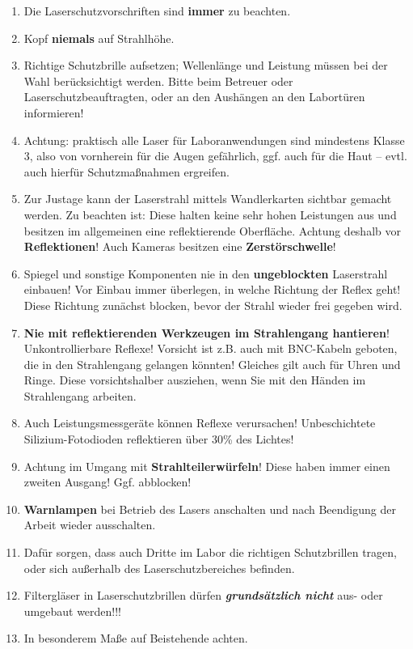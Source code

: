 \documentclass[
class=book,
accentcolor=1b,
custommargins=geometry,
fontsize=11pt,
thesis={type=Versuchsanleitung},
ruledheaders=all,
headline=false,
instbox=false,
marginpar=false,
title=small,
ignore-missing-data=true,
twoside=false,
logofile=apqdesign/tuda_logo.pdf,
pdfa=false %
]{apqpub}
\begin{document}
\begin{enumerate}
\item Die Laserschutzvorschriften sind \textbf{immer} zu beachten.
\vspace{-2pt}
\item Kopf \textbf{niemals} auf Strahlhöhe.
\vspace{-2pt}
\item Richtige Schutzbrille aufsetzen; Wellenlänge und Leistung müssen bei der Wahl berücksichtigt werden. Bitte beim Betreuer oder Laserschutzbeauftragten, oder an den Aushängen an den Labortüren informieren!
\vspace{-2pt}
\item Achtung: praktisch alle Laser für Laboranwendungen sind mindestens Klasse 3, also von vornherein für die Augen gefährlich, ggf. auch für die Haut -- evtl. auch hierfür Schutzmaßnahmen ergreifen.
\vspace{-2pt}
\item Zur Justage kann der Laserstrahl mittels Wandlerkarten sichtbar gemacht werden. Zu beachten ist: Diese halten keine sehr hohen Leistungen aus und besitzen im allgemeinen eine reflektierende Oberfläche. Achtung deshalb vor \textbf{Reflektionen}! Auch Kameras
besitzen eine \textbf{Zerstörschwelle}!
\vspace{-2pt}
\item Spiegel und sonstige Komponenten nie in den \textbf{ungeblockten} Laserstrahl einbauen! Vor Einbau immer überlegen, in welche Richtung der Reflex geht! Diese Richtung zunächst blocken, bevor der Strahl wieder frei gegeben wird.
\vspace{-2pt}
\item \textbf{Nie mit reflektierenden Werkzeugen im Strahlengang hantieren}! Unkontrollierbare Reflexe! Vorsicht ist z.B. auch mit BNC-Kabeln geboten, die in den Strahlengang gelangen könnten!
Gleiches gilt auch für Uhren und Ringe. Diese vorsichtshalber ausziehen, wenn Sie mit den Händen im Strahlengang arbeiten.
\vspace{-2pt}
\item Auch Leistungsmessgeräte können Reflexe verursachen! Unbeschichtete Silizium-Fotodioden reflektieren über 30\% des Lichtes!
\vspace{-2pt}
\item Achtung im Umgang mit \textbf{Strahlteilerwürfeln}! Diese haben immer einen zweiten Ausgang! Ggf. abblocken!
\vspace{-2pt}
\item \textbf{Warnlampen} bei Betrieb des Lasers anschalten und nach Beendigung der Arbeit wieder ausschalten.
\vspace{-2pt}
\item Dafür sorgen, dass auch Dritte im Labor die richtigen Schutzbrillen tragen, oder sich außerhalb des Laserschutzbereiches befinden.
\vspace{-2pt}
\item Filtergläser in Laserschutzbrillen dürfen \textbf{\textit{grundsätzlich nicht}} aus- oder umgebaut
werden!!!
\vspace{-2pt}
\item In besonderem Maße auf Beistehende achten.
\end{enumerate}
\end{document}
